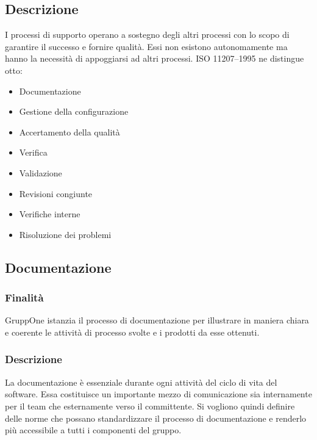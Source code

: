 \documentclass[../norme-di-progetto.tex]{subfiles}
\begin{document}
\subsection{Descrizione}%
\label{sub:processi_di_supporto/descrizione}

I processi di supporto operano a sostegno degli altri processi con lo scopo di garantire il successo e fornire qualità.
Essi non esistono autonomamente ma hanno la necessità di appoggiarsi ad altri processi.
ISO 11207--1995 ne distingue otto:

\begin{itemize}
  \item Documentazione
  \item Gestione della configurazione
  \item Accertamento della qualità
  \item Verifica
  \item Validazione
  \item Revisioni congiunte
  \item Verifiche interne
  \item Risoluzione dei problemi
\end{itemize}

\subsection{Documentazione}%
\label{sub:documentazione}

\subsubsection{Finalità}%
\label{subs:documentazione/finalita}

GruppOne istanzia il processo di documentazione per illustrare in maniera chiara e coerente le attività di processo svolte e i prodotti da esse ottenuti.

\subsubsection{Descrizione}%
\label{subs:documentazione/descrizione}

La documentazione è essenziale durante ogni attività del ciclo di vita del software.
Essa costituisce un importante mezzo di comunicazione sia internamente per il team che esternamente verso il committente.
Si vogliono quindi definire delle norme che possano standardizzare il processo di documentazione e renderlo più accessibile a tutti i componenti del gruppo.
\end{document}
